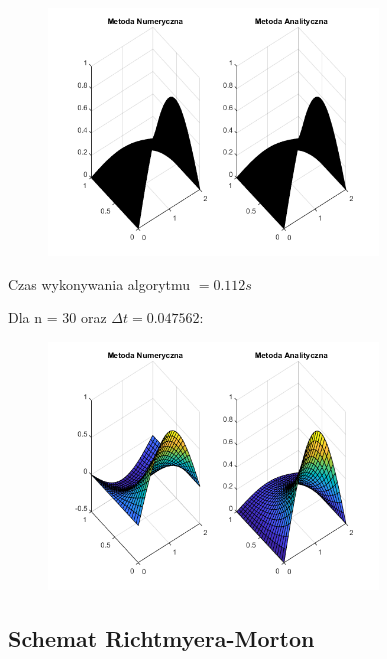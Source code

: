 \begin{figure}[!ht]
	\begin{center}
		\includegraphics[width=0.78\textwidth]{Lab7/charts/df/30_2.png}
	\end{center}
\end{figure}


Czas wykonywania algorytmu $ = 0.112 s$

Dla n = 30 oraz $\Delta t = 0.047562$:

\begin{figure}[!ht]
	\begin{center}
		\includegraphics[width=0.78\textwidth]{Lab7/charts/df/30_2_k.png}
	\end{center}
\end{figure}


\newpage
\subsection{Schemat Richtmyera-Morton}

